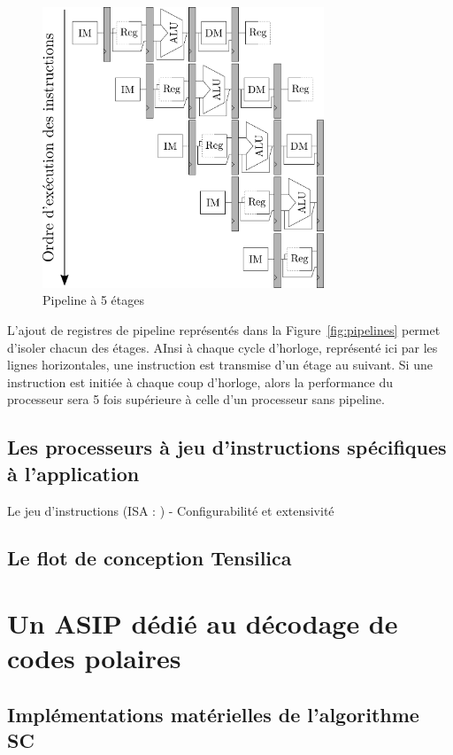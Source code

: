 \begin{figure}[t]
\centering
\includegraphics[width=0.75\textwidth]{main/ch3_fig/pipelines}
\caption{Pipeline à 5 étages}
\end{figure}


L'ajout de registres de pipeline représentés dans la Figure~\ref{fig:pipelines} permet d'isoler chacun des étages. AInsi à chaque cycle d'horloge, représenté ici par les lignes horizontales, une instruction est transmise d'un étage au suivant. Si une instruction est initiée à chaque coup d'horloge, alors la performance du processeur sera 5 fois supérieure à celle d'un processeur sans pipeline.






\subsection{Les processeurs à jeu d'instructions spécifiques à l'application}



Le jeu d'instructions (ISA : )
- Configurabilité et extensivité


\subsection{Le flot de conception Tensilica}
\label{tensilica_design}
\section{Un ASIP dédié au décodage de codes polaires}
\subsection{Implémentations matérielles de l'algorithme SC}
\label{subsec:sota_sc}
